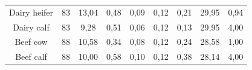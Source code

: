 \documentclass[10pt,a4paper]{article}
\begin{document}
\begin{table}[H]
{\begin{tabular}{@{}ccccccccc@{}}
		Dairy heifer                                             & 83                                                     & 13,04                                                           & 0,48                                                     & 0,09                                                     & 0,12                                                      & 0,21                                                     & 29,95                                                              & 0,94                                                              \\
		Dairy calf                                               & 83                                                     & 9,28                                                            & 0,51                                                     & 0,06                                                     & 0,12                                                      & 0,13                                                     & 29,95                                                              & 4,00                                                              \\
		Beef cow                                                 & 88                                                     & 10,58                                                           & 0,34                                                     & 0,08                                                     & 0,12                                                      & 0,24                                                     & 28,58                                                              & 1,00                                                              \\
		Beef calf                                                & 88                                                     & 10,00                                                           & 0,58                                                     & 0,10                                                     & 0,12                                                      & 0,38                                                     & 28,14                                                              & 4,00                                                              \\ \bottomrule
	\end{tabular}}
\end{table}
\end{document}
